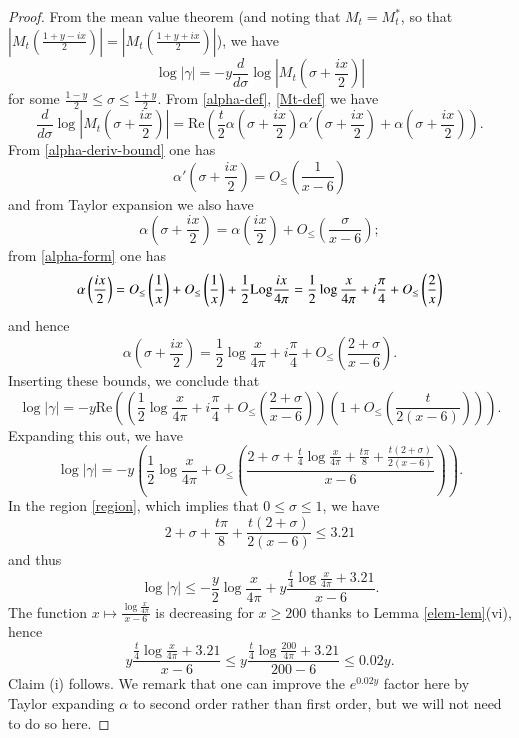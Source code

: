 \begin{proof}
From the mean value theorem (and noting that $M_t = M_t^*$, so that $\left|M_t\left(\frac{1+y-ix}{2}\right)\right| = \left|M_t\left(\frac{1+y+ix}{2}\right)\right|$), we have
$$ \log|\gamma| = -y \frac{d}{d\sigma} \log \left|M_t\left( \sigma + \frac{ix}{2}\right)\right| $$
for some $\frac{1-y}{2} \leq \sigma \leq \frac{1+y}{2}$.  From \eqref{alpha-def}, \eqref{Mt-def} we have
$$ \frac{d}{d\sigma} \log \left|M_t\left( \sigma + \frac{ix}{2}\right)\right| = \mathrm{Re}\left( \frac{t}{2} \alpha\left(\sigma+\frac{ix}{2}\right) \alpha'\left(\sigma+\frac{ix}{2}\right) + \alpha\left(\sigma+\frac{ix}{2}\right) \right).$$
From \eqref{alpha-deriv-bound} one has
\begin{equation}\label{alphap-b}
 \alpha'\left(\sigma+\frac{ix}{2}\right) = O_{\leq}\left( \frac{1}{x-6} \right)
\end{equation}
and from Taylor expansion we also have
$$ \alpha(\sigma+\frac{ix}{2}) = \alpha\left(\frac{ix}{2}\right) + O_{\leq}\left( \frac{\sigma}{x-6} \right);$$
from \eqref{alpha-form} one has
$$ \alpha\left(\frac{ix}{2}\right) = O_{\leq}\left(\frac{1}{x}\right) + O_{\leq}\left(\frac{1}{x}\right) + \frac{1}{2} {\operatorname{Log}} \frac{ix}{4\pi} 
= \frac{1}{2} \log \frac{x}{4\pi} + i \frac{\pi}{4} + O_{\leq}\left( \frac{2}{x} \right) $$
and hence
\begin{equation}\label{asig}
 \alpha(\sigma+\frac{ix}{2}) = \frac{1}{2} \log \frac{x}{4\pi} + i \frac{\pi}{4} + O_{\leq}\left( \frac{2+\sigma}{x-6} \right).
\end{equation}
Inserting these bounds, we conclude that
$$ \log|\gamma| = -y \mathrm{Re} \left( \left(\frac{1}{2} \log \frac{x}{4\pi} + i \frac{\pi}{4} + O_{\leq}\left( \frac{2+\sigma}{x-6} \right)\right) \left(1 + O_{\leq}\left(\frac{t}{2(x-6)}\right)\right) \right).$$
Expanding this out, we have
$$ \log|\gamma| = -y (\frac{1}{2} \log \frac{x}{4\pi} + O_{\leq}\left( \frac{2+\sigma + \frac{t}{4} \log \frac{x}{4\pi} + \frac{t\pi}{8} + \frac{t(2+\sigma)}{2(x-6)}}{x-6} \right)).$$
In the region \eqref{region}, which implies that $0 \leq \sigma \leq 1$, we have
$$ 2 + \sigma + \frac{t\pi}{8} + \frac{t(2+\sigma)}{2(x-6)} \leq 3.21$$
and thus
$$ \log|\gamma| \leq -\frac{y}{2} \log \frac{x}{4\pi} + y \frac{\frac{t}{4} \log \frac{x}{4\pi} + 3.21}{x-6}.$$
The function $x \mapsto \frac{\log \frac{x}{4\pi}}{x-6}$ is decreasing for $x \geq 200$ thanks to Lemma \ref{elem-lem}(vi), hence
$$ y \frac{\frac{t}{4} \log \frac{x}{4\pi} + 3.21}{x-6} \leq y \frac{\frac{t}{4} \log \frac{200}{4\pi} + 3.21}{200-6} \leq 0.02 y.$$
Claim (i) follows.  We remark that one can improve the $e^{0.02 y}$ factor here by Taylor expanding $\alpha$ to second order rather than first order, but we will not need to do so here.


\end{proof}
